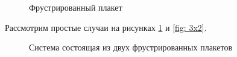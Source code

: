 \documentclass[utf8, babel, sor, jor, amsmath, amssymb, reprint]{elsarticle} %
\begin{document}
\begin{figure}[H]
	\centering
\begin{minipage}{0.3\textwidth}
	\centering
	\caption{Фрустрированный плакет}
	\label{fig:struna}
\end{minipage}
\end{figure}
Рассмотрим простые случаи на рисунках  \ref{fig:struna} и \ref{fig: 3x2}.

\begin{figure}[H]
	\centering
\begin{minipage}{0.3\textwidth}
		\centering
		\caption{Система состоящая из двух фрустрированных плакетов}
		\label{fig:3x2}
	\end{minipage}
\end{figure}
\end{document}
